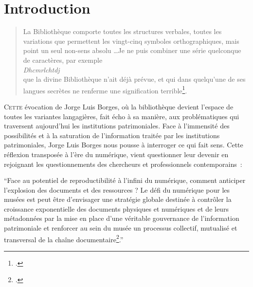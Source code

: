 \chapter{Introduction}

\begin{quote}
	
	
	
	\og La Bibliothèque comporte toutes les structures verbales, toutes les variations que permettent les vingt-cinq symboles orthographiques, mais point un seul non-sens absolu \dots Je ne puis combiner une série quelconque de caractères, par exemple \\\textit{Dhcmrlchtdj}\\ que la divine Bibliothèque n’ait déjà prévue, et qui dans quelqu'une de ses langues secrètes ne renferme une signification terrible\footcite{borgesBibliothequeBabel1990}.\fg
	
	
	
\end{quote}





\lettrine{C}{ette} évocation de Jorge Luis Borges, où la bibliothèque devient l’espace de toutes les variantes langagières, fait écho à sa manière, aux problématiques qui traversent aujourd’hui les institutions patrimoniales. Face à l’immensité des possibilités et à la saturation de l'information traitée par les institutions patrimoniales, Jorge Luis Borges nous pousse à interroger ce qui fait sens. Cette réflexion transposée à l’ère du numérique, vient questionner leur devenir en rejoignant les questionnements des chercheurs et professionnels contemporains~: 

\enquote{Face au potentiel de reproductibilité à l’infini du numérique, comment anticiper l’explosion des documents et des ressources ? Le défi du numérique pour les musées est peut être d’envisager une stratégie globale destinée à contrôler la croissance exponentielle des documents physiques et numériques et de leurs métadonnées par la mise en place d’une véritable gouvernance de l’information patrimoniale et renforcer au sein du musée un processus collectif, mutualisé et transversal de la chaîne documentaire\footcite{rizzaDocumentAuCoeur2014}.}



\medskip





